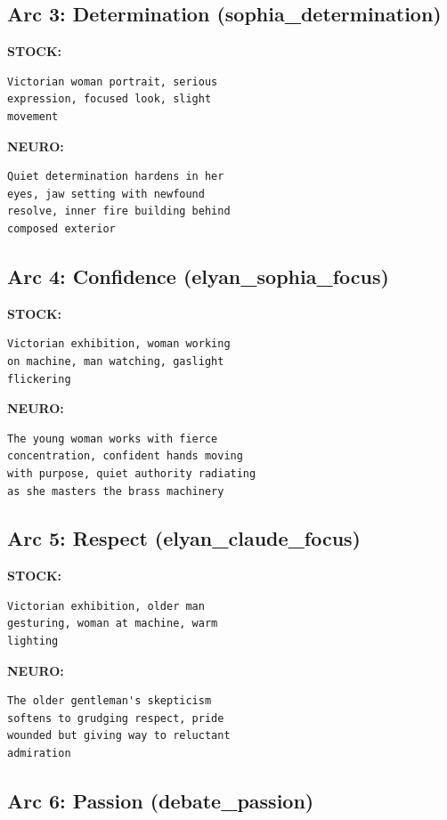 \documentclass[10pt,twocolumn,letterpaper]{article}
\begin{document}
\subsection{Arc 3: Determination (sophia\_determination)}

\textbf{STOCK:}
\begin{lstlisting}
Victorian woman portrait, serious
expression, focused look, slight
movement
\end{lstlisting}

\textbf{NEURO:}
\begin{lstlisting}
Quiet determination hardens in her
eyes, jaw setting with newfound
resolve, inner fire building behind
composed exterior
\end{lstlisting}

\subsection{Arc 4: Confidence (elyan\_sophia\_focus)}

\textbf{STOCK:}
\begin{lstlisting}
Victorian exhibition, woman working
on machine, man watching, gaslight
flickering
\end{lstlisting}

\textbf{NEURO:}
\begin{lstlisting}
The young woman works with fierce
concentration, confident hands moving
with purpose, quiet authority radiating
as she masters the brass machinery
\end{lstlisting}

\subsection{Arc 5: Respect (elyan\_claude\_focus)}

\textbf{STOCK:}
\begin{lstlisting}
Victorian exhibition, older man
gesturing, woman at machine, warm
lighting
\end{lstlisting}

\textbf{NEURO:}
\begin{lstlisting}
The older gentleman's skepticism
softens to grudging respect, pride
wounded but giving way to reluctant
admiration
\end{lstlisting}

\subsection{Arc 6: Passion (debate\_passion)}
\end{document}
